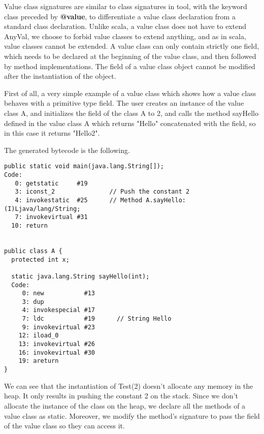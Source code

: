
Value class signatures are similar to class signatures in tool, with the keyword class preceded by \textbf{@value}, to differentiate a value class declaration from a standard class declaration. \newline
Unlike scala, a value class does not have to extend AnyVal, we choose to forbid value classes to extend anything, and as in scala, value classes cannot be extended.\newline
A value class can only contain strictly one field, which needs to be declared at the beginning of the value class, and then followed by method implementations. The field of a value class object cannot be modified after the instantiation of the object.\newline

First of all, a very simple example of a value class which shows how a value class behaves with a primitive type field. The user creates an instance of the value class A, and initializes the field of the class A to 2, and calls the method sayHello defined in the value class A which returns "Hello" concatenated with the field, so in this case it returns "Hello2".



The generated bytecode is the following.

\begin{lstlisting}
public static void main(java.lang.String[]);
Code:
   0: getstatic     #19 
   3: iconst_2               // Push the constant 2 
   4: invokestatic  #25      // Method A.sayHello:(I)Ljava/lang/String;
   7: invokevirtual #31 
  10: return


public class A {
  protected int x;

  static java.lang.String sayHello(int);
  Code:
     0: new           #13
     3: dup
     4: invokespecial #17
     7: ldc           #19      // String Hello
     9: invokevirtual #23
    12: iload_0
    13: invokevirtual #26
    16: invokevirtual #30
    19: areturn
}
\end{lstlisting}

We can see that the instantiation of Test(2) doesn't allocate any memory in the heap. 
It only results in pushing the constant 2 on the stack. \newline
Since we don't allocate the instance of the class on the heap, we declare all the methods of a value class as static. Moreover, we modify the method's signature to pass the field of the value class so they can access it.

